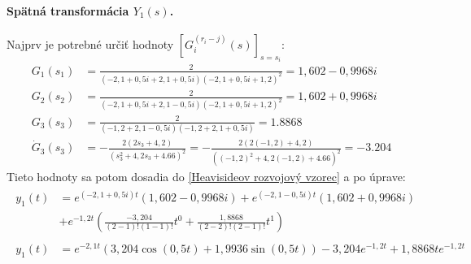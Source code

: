 \documentclass[a4paper, 10pt, ]{article}
\begin{document}
\paragraph{Spätná transformácia $Y_1(s)$.}
Najprv je potrebné určiť hodnoty $\left[ G_i^{(r_i-j)} (s) \right]_{s = s_i}$:
\begin{subequations}
	\begin{align}
		G_1(s_1) &= \frac{2}{\left( -2,1 + 0,5i+2,1+0,5i \right)\left( -2,1 + 0,5i+1,2 \right)^2 } = 1,602 - 0,9968i \\
		G_2(s_2) &= \frac{2}{\left( -2,1 + 0,5i+2,1-0,5i \right)\left( -2,1 + 0,5i+1,2 \right)^2 } = 1,602 + 0,9968i \\
		G_3(s_3) &= \frac{2}{\left( -1,2+2,1-0,5i \right)\left( -1,2+2,1+0,5i \right)} = 1.8868 \\
		\dot{G}_3(s_3) &= - \frac{2\left( 2s_3 + 4,2 \right)}{\left( s_3^2 +4,2s_3 +4.66 \right)^2} = - \frac{2\left( 2(-1,2) + 4,2 \right)}{\left( (-1,2)^2 +4,2(-1,2) +4.66 \right)^2} = -3.204
	\end{align}
\end{subequations}
Tieto hodnoty sa potom dosadia do \eqref{Heavisideov rozvojový vzorec} a po úprave:
\begin{subequations}
	\begin{align}
		\begin{split}
			y_1(t) &= e^{(-2,1 + 0,5i)t}\left( 1,602 - 0,9968i \right) + e^{(-2,1 - 0,5i)t}\left( 1,602 + 0,9968i \right) \\
			       &+ e^{-1,2t}\left( \frac{-3,204}{(2-1)!(1-1)!}t^0 + \frac{1,8868}{(2-2)!(2-1)!}t^1\right)
		\end{split}	\\
		\begin{split}
			y_1(t) &= e^{-2,1t} \left( 3,204 \cos(0,5t) +1,9936 \sin(0,5t) \right) -3,204 e^{-1,2t} + 1,8868te^{-1,2t}
		\end{split}
	\end{align}
\end{subequations}
\end{document}
